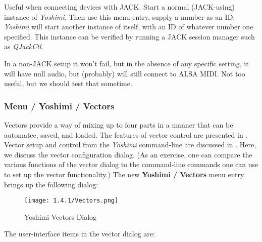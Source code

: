    Useful when connecting devices with JACK.
   Start a normal (JACK-using) instance of \textsl{Yoshimi}.
   Then use this menu entry, supply a number as an ID.
   \textsl{Yoshimi} will start another instance
   of itself, with an ID of whatever number one specified.
   This instance can be verified by running a JACK session manager such as
   \textsl{QJackCtl}.

   In a non-JACK setup it won't fail, but in the absence of any specific
   setting, it will have null audio, but (probably) will still connect to ALSA
   MIDI.  Not too useful, but we should test that sometime.

\subsubsection{Menu / Yoshimi / Vectors}
\label{subsubsec:menu_yoshimi_vectors}

   Vectors provide a way of mixing up to four parts in a manner that can be
   automatec, saved, and loaded.  The features of vector control are presented
   in .
   Vector setup and control from the \textsl{Yoshimi} command-line are
   discussed in
   .
   Here, we discuss the vector configuration dialog.
   (As an exercise, one can compare the various functions of the vector dialog
   to the command-line commands one can use to set up the vector
   functionality.)
   The new \textbf{Yoshimi / Vectors} menu entry brings up the following
   dialog:

\begin{figure}[H]
   \centering 
   \texttt{[image: 1.4.1/Vectors.png]}
   \caption{Yoshimi Vectors Dialog}
   \label{fig:yoshimi_vectors_dialog}
\end{figure}

   The user-interface items in the vector dialog are:

